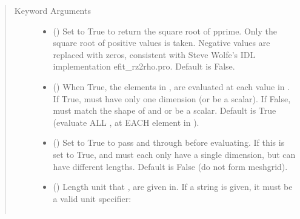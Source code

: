 \documentclass[letterpaper,10pt,english]{sphinxmanual}
\begin{document}
\begin{fulllineitems}
\begin{fulllineitems}
\begin{quote}
\begin{description}
\begin{itemize}
\end{itemize}

\item[{Keyword Arguments}] \leavevmode\begin{itemize}
\item {} 
 () \textendash{} Set to True to return the square root of pprime.
Only the square root of positive values is taken. Negative
values are replaced with zeros, consistent with Steve Wolfe’s
IDL implementation efit\_rz2rho.pro. Default is False.

\item {} 
 () \textendash{} When True, the elements in ,  are evaluated
at each value in . If True,  must have only one dimension
(or be a scalar). If False,  must match the shape of  and
 or be a scalar. Default is True (evaluate ALL ,  at
EACH element in ).

\item {} 
 () \textendash{} Set to True to pass  and  through
 before evaluating. If this is set to
True,  and  must each only have a single dimension, but
can have different lengths. Default is False (do not form
meshgrid).

\item {} 
 () \textendash{} 
Length unit that ,  are given in.
If a string is given, it must be a valid unit specifier:
\begin{quote}


\begin{savenotes}\sphinxattablestart
\centering
\begin{tabulary}{\linewidth}[t]{|T|T|}
\hline


\end{tabulary}
\end{savenotes}
\end{quote}
\end{itemize}
\end{description}
\end{quote}
\end{fulllineitems}
\end{fulllineitems}
\end{document}

